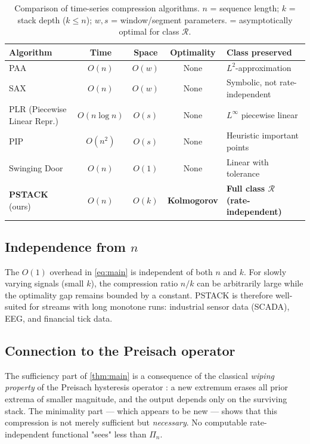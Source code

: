\documentclass[preprint,12pt]{elsarticle}
\newcommand{\R}{\mathcal{R}}
\newcommand{\stack}{\Pi}
\begin{document}
\begin{table}[t]
\centering
\caption{Comparison of time-series compression algorithms.
$n$ = sequence length; $k$ = stack depth ($k \leq n$);
$w, s$ = window/segment parameters.
\textdagger{} = asymptotically optimal for class $\R$.}
\label{tab:compare}
\small
\begin{tabular}{lcccp{3.2cm}}
\toprule
Algorithm & Time & Space & Optimality & Class preserved \\
\midrule
PAA \citep{Keogh2001} & $O(n)$ & $O(w)$ & None &
  $L^2$-approximation \\
SAX \citep{Lin2003} & $O(n)$ & $O(w)$ & None &
  Symbolic, not rate-independent \\
PLR (Piecewise Linear Repr.) & $O(n\log n)$ & $O(s)$ & None &
  $L^\infty$ piecewise linear \\
PIP & $O(n^2)$ & $O(s)$ & None &
  Heuristic important points \\
Swinging Door & $O(n)$ & $O(1)$ & None &
  Linear with tolerance \\
\midrule
\textbf{PSTACK} (ours) & $O(n)$ & $O(k)$ &
  \textbf{\textdagger{} Kolmogorov} &
  \textbf{Full class $\R$ (rate-independent)} \\
\bottomrule
\end{tabular}
\end{table}

\subsection{Independence from $n$}

The $O(1)$ overhead in \eqref{eq:main} is independent of both $n$ and $k$.
For slowly varying signals (small $k$), the compression ratio
$n/k$ can be arbitrarily large while the optimality gap remains
bounded by a constant.
PSTACK is therefore well-suited for streams with long monotone runs:
industrial sensor data (SCADA), EEG, and financial tick data.

\subsection{Connection to the Preisach operator}

The sufficiency part of \cref{thm:main} is a consequence of
the classical \emph{wiping property} of the Preisach hysteresis
operator \citep{Mayergoyz1991}: a new extremum erases all prior
extrema of smaller magnitude, and the output depends only on the
surviving stack.
The minimality part — which appears to be new — shows that this
compression is not merely sufficient but \emph{necessary}.
No computable rate-independent functional "sees" less than
$\stack_n$.
\end{document}
